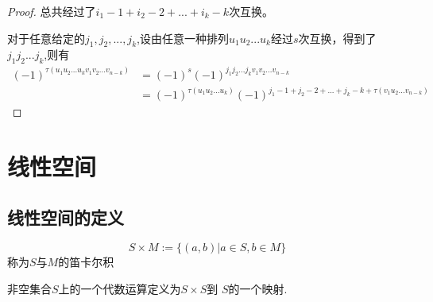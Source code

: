 \documentclass[blue,normal,cn]{elegantnote}
\begin{document}
\begin{proof}
    总共经过了$i_1-1+i_2-2+...+i_k-k$次互换。

    对于任意给定的$j_1,j_2,...,j_k$,设由任意一种排列$u_1u_2...u_k$经过$s$次互换，得到了$j_1 j_2...j_k$,则有
    \begin{equation*}
        \begin{aligned}
           (-1)^{\tau(u_1 u_2 ... u_kv_1 v_2 ... v_{n-k})}&=(-1)^s (-1)^{j_1 j_2... j_k v_1 v_2 ... v_{n-k}}\\
           &=(-1)^{\tau(u_1 u_2 ... u_k)}(-1)^{j_1-1+j_2-2+...+j_k-k +\tau(v_1 u_2 ... v_{n-k})}
        \end{aligned}
    \end{equation*}



\end{proof}



\section{线性空间}
\subsection{线性空间的定义}

\begin{definition}
    $$S\times M:=\{(a,b)|a∈ S,b ∈ M\}$$
称为$S$与$M$的笛卡尔积
\end{definition}

\begin{definition}
   非空集合$S$上的一个代数运算定义为$S\times S$到 $S$的一个映射.
\end{definition}
\end{document}

